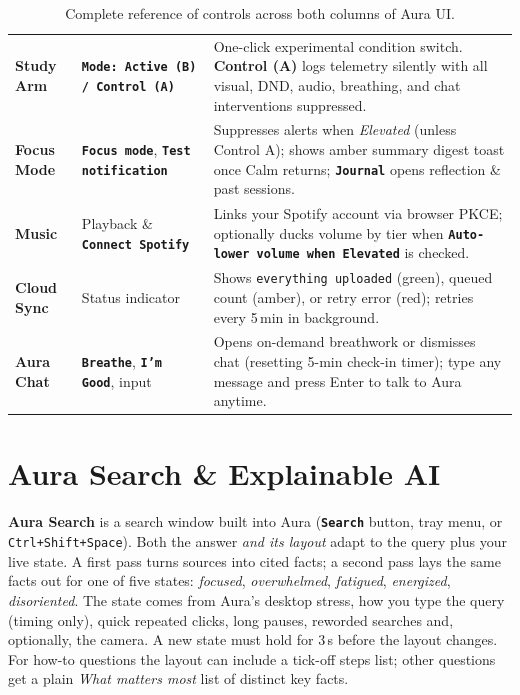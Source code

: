 \documentclass[11pt,a4paper]{article}
\newcommand{\uictrl}[1]{\texttt{\textbf{#1}}}
\begin{document}
\begin{table}[htbp]
\begin{tabularx}{\textwidth}{>{\raggedright\arraybackslash}p{2.1cm} >{\raggedright\arraybackslash}p{3.6cm} >{\raggedright\arraybackslash}X}
\textbf{Study Arm} & \uictrl{Mode: Active (B) / Control (A)} & One-click experimental condition switch. \textbf{Control (A)} logs telemetry silently with all visual, DND, audio, breathing, and chat interventions suppressed. \\
\textbf{Focus Mode} & \uictrl{Focus mode}, \uictrl{Test notification} & Suppresses alerts when \textit{Elevated} (unless Control A); shows amber summary digest toast once Calm returns; \uictrl{Journal} opens reflection \& past sessions. \\
\textbf{Music} & Playback \& \uictrl{Connect Spotify} & Links your Spotify account via browser PKCE; optionally ducks volume by tier when \uictrl{Auto-lower volume when Elevated} is checked. \\
\textbf{Cloud Sync} & Status indicator & Shows \texttt{everything uploaded} (green), queued count (amber), or retry error (red); retries every 5\,min in background. \\
\textbf{Aura Chat} & \uictrl{Breathe}, \uictrl{I'm Good}, input & Opens on-demand breathwork or dismisses chat (resetting 5-min check-in timer); type any message and press Enter to talk to Aura anytime. \\
\bottomrule
\end{tabularx}
\caption{Complete reference of controls across both columns of Aura UI.}
\label{tab:controls}
\end{table}

\clearpage   %
\section{Aura Search \& Explainable AI}
\label{sec:search}

\textbf{Aura Search} is a search window built into Aura (\uictrl{Search} button, tray menu, or \texttt{Ctrl+Shift+Space}). Both the answer \emph{and its layout} adapt to the query plus your live state. A first pass turns sources into cited facts; a second pass lays the same facts out for one of five states: \textit{focused}, \textit{overwhelmed}, \textit{fatigued}, \textit{energized}, \textit{disoriented}. The state comes from Aura's desktop stress, how you type the query (timing only), quick repeated clicks, long pauses, reworded searches and, optionally, the camera. A new state must hold for 3\,s before the layout changes. For how-to questions the layout can include a tick-off steps list; other questions get a plain \textit{What matters most} list of distinct key facts.
\end{document}

